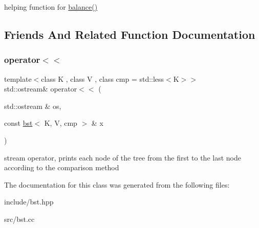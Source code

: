 helping function for \hyperlink{classBST_1_1bst_af4df6a5c2ae79c5133688b3e117d622b}{balance()} 

\subsection{Friends And Related Function Documentation}
\mbox{\label{classBST_1_1bst_ae4b7d69364fca0855f74abdcad674ebf}} 
\subsubsection{\texorpdfstring{operator$<$$<$}{operator<<}}
{\footnotesize\ttfamily template$<$class K , class V , class cmp  = std\+::less$<$\+K$>$$>$ \\
std\+::ostream\& operator$<$$<$ (\begin{DoxyParamCaption}\item[{std\+::ostream \&}]{os,  }\item[{const \hyperlink{classBST_1_1bst}{bst}$<$ K, V, cmp $>$ \&}]{x }\end{DoxyParamCaption})\hspace{0.3cm}{\ttfamily [friend]}}

stream operator, prints each node of the tree from the first to the last node according to the comparison method 

The documentation for this class was generated from the following files\+:\begin{DoxyCompactItemize}
\item 
include/bst.\+hpp\item 
src/bst.\+cc\end{DoxyCompactItemize}
